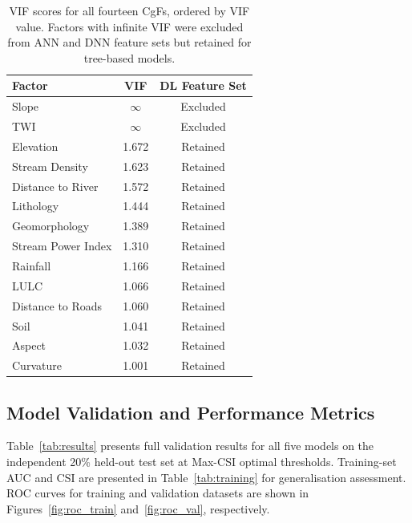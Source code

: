 \documentclass[12pt, a4paper]{article}
\begin{document}
\begin{table}[H]
\centering
\caption{VIF scores for all fourteen CgFs, ordered by VIF value. Factors with infinite VIF were excluded from ANN and DNN feature sets but retained for tree-based models.}
\label{tab:vif}
\small
\begin{tabular}{lcc}
\toprule
\textbf{Factor} & \textbf{VIF} & \textbf{DL Feature Set} \\
\midrule
Slope             & $\infty$ & Excluded \\
TWI               & $\infty$ & Excluded \\
Elevation         & 1.672    & Retained \\
Stream Density    & 1.623    & Retained \\
Distance to River & 1.572    & Retained \\
Lithology         & 1.444    & Retained \\
Geomorphology     & 1.389    & Retained \\
Stream Power Index & 1.310   & Retained \\
Rainfall          & 1.166    & Retained \\
LULC              & 1.066    & Retained \\
Distance to Roads & 1.060    & Retained \\
Soil              & 1.041    & Retained \\
Aspect            & 1.032    & Retained \\
Curvature         & 1.001    & Retained \\
\bottomrule
\end{tabular}
\end{table}

\subsection{Model Validation and Performance Metrics}

Table~\ref{tab:results} presents full validation results for all five models on the independent 20\% held-out test set at Max-CSI optimal thresholds. Training-set AUC and CSI are presented in Table~\ref{tab:training} for generalisation assessment. ROC curves for training and validation datasets are shown in Figures~\ref{fig:roc_train} and~\ref{fig:roc_val}, respectively.
\end{document}

